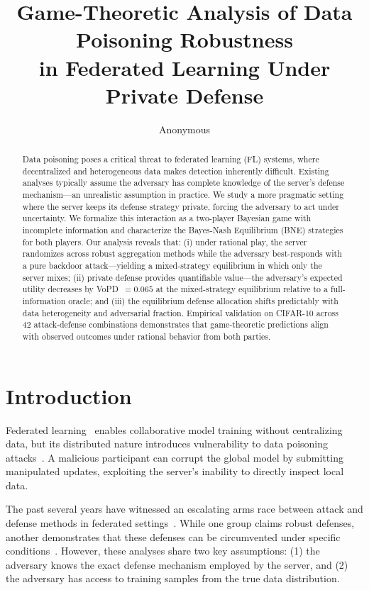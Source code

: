 \documentclass{article}
\title{Game-Theoretic Analysis of Data Poisoning Robustness\\in Federated Learning Under Private Defense}
\author{Anonymous}
\begin{document}
\maketitle

\begin{abstract}
Data poisoning poses a critical threat to federated learning (FL) systems, where decentralized and heterogeneous data makes detection inherently difficult. Existing analyses typically assume the adversary has complete knowledge of the server's defense mechanism---an unrealistic assumption in practice. We study a more pragmatic setting where the server keeps its defense strategy private, forcing the adversary to act under uncertainty. We formalize this interaction as a two-player Bayesian game with incomplete information and characterize the Bayes-Nash Equilibrium (BNE) strategies for both players. Our analysis reveals that: (i) under rational play, the server randomizes across robust aggregation methods while the adversary best-responds with a pure backdoor attack---yielding a mixed-strategy equilibrium in which only the server mixes; (ii) private defense provides quantifiable value---the adversary's expected utility decreases by VoPD~$= 0.065$ at the mixed-strategy equilibrium relative to a full-information oracle; and (iii) the equilibrium defense allocation shifts predictably with data heterogeneity and adversarial fraction. Empirical validation on CIFAR-10 across 42 attack-defense combinations demonstrates that game-theoretic predictions align with observed outcomes under rational behavior from both parties.
\end{abstract}

\section{Introduction}
\label{sec:intro}

Federated learning~\citep{mcmahan2017communication} enables collaborative model training without centralizing data, but its distributed nature introduces vulnerability to data poisoning attacks~\citep{chen2017targeted,bagdasaryan2020backdoor}. A malicious participant can corrupt the global model by submitting manipulated updates, exploiting the server's inability to directly inspect local data.

The past several years have witnessed an escalating arms race between attack and defense methods in federated settings~\citep{wang2020attack,xie2019dba,pillutla2019robust,sun2019can}. While one group claims robust defenses, another demonstrates that these defenses can be circumvented under specific conditions~\citep{bhagoji2019analyzing}. However, these analyses share two key assumptions: (1) the adversary knows the exact defense mechanism employed by the server, and (2) the adversary has access to training samples from the true data distribution.
\end{document}
